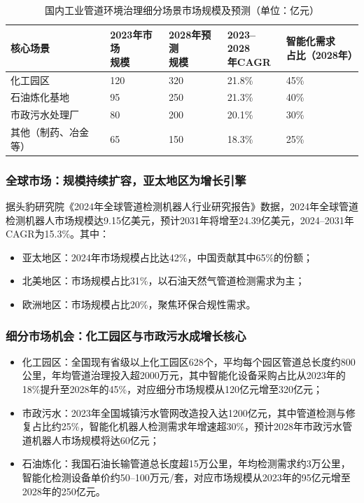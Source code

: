 \documentclass[12pt, a4paper]{article}
\begin{document}
\begin{table}[H]
\centering
\caption{国内工业管道环境治理细分场景市场规模及预测（单位：亿元）}
\label{tab:scene}
\begin{tabularx}{0.85\linewidth}{lXXXX}
\toprule
核心场景 &
\shortstack{2023年市场\\规模} &
\shortstack{2028年预测\\规模} &
\shortstack{2023–2028\\年CAGR} &
\shortstack{智能化需求\\占比（2028年）}\\
\midrule
化工园区 & 120 & 320 & 21.8\% & 45\%\\
石油炼化基地 & 95 & 250 & 21.3\% & 40\%\\
市政污水处理厂 & 80 & 200 & 20.1\% & 30\%\\
其他（制药、冶金等） & 65 & 150 & 18.3\% & 25\%\\
\bottomrule
\end{tabularx}
\end{table}

\subsubsection{全球市场：规模持续扩容，亚太地区为增长引擎}
据头豹研究院《2024年全球管道检测机器人行业研究报告》数据，2024年全球管道检测机器人市场规模达9.15亿美元，预计2031年将增至24.39亿美元，2024–2031年CAGR为15.3\%。其中：
\begin{itemize}
  \item 亚太地区：2024年市场规模占比达42\%，中国贡献其中65\%的份额；
  \item 北美地区：市场规模占比31\%，以石油天然气管道检测需求为主；
  \item 欧洲地区：市场规模占比20\%，聚焦环保合规性需求。
\end{itemize}

\subsubsection{细分市场机会：化工园区与市政污水成增长核心}
\begin{itemize}
  \item 化工园区：全国现有省级以上化工园区628个，平均每个园区管道总长度约800公里，年均管道治理投入超2000万元，其中智能化设备采购占比从2023年的18\%提升至2028年的45\%，对应细分市场规模从120亿元增至320亿元；
  \item 市政污水：2023年全国城镇污水管网改造投入达1200亿元，其中管道检测与修复占比约25\%，智能化机器人检测需求年增速超30\%，预计2028年市政污水管道机器人市场规模将达60亿元；
  \item 石油炼化：我国石油长输管道总长度超15万公里，年均检测需求约3万公里，智能化检测设备单价约50--100万元/套，对应市场规模从2023年的95亿元增至2028年的250亿元。
\end{itemize}
\end{document}
